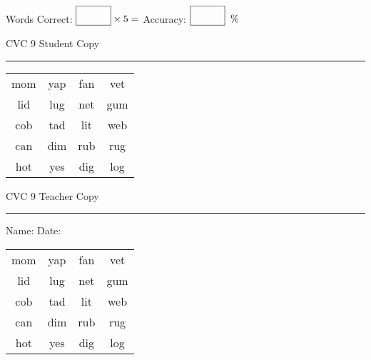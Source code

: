 \documentclass{memoir}
\begin{document}
\small

Words Correct: $\fbox{\phantom{\huge 100}} \times 5 = $ Accuracy: $\fbox{\phantom{\huge 100}}\;\; \%$ 

\vfill

\newpage


\footnotesize \noindent
CVC 9 \hfill Student Copy
\smallskip
\hrule

\Large

\setlength{\tabcolsep}{14pt}
\def\arraystretch{2}

{\selectfont


\begin{vplace}[0.5]
\begin{center}
\begin{tabular}{cccc}
mom & yap & fan & vet \\
lid & lug & net & gum  \\
cob & tad & lit & web \\
can & dim & rub & rug \\
hot & yes & dig & log \\
\end{tabular}
\end{center}
\end{vplace}

}

\newpage

\footnotesize \noindent
CVC 9 \hfill Teacher Copy
\smallskip
\hrule

\small

\vfill

\noindent
Name: \underline{\hspace{1.75in}} \hfill Date: \underline{\hspace{1in}}

\Large

{\selectfont


\begin{vplace}[0.5]
\begin{center}
\begin{tabular}{cccc}
mom & yap & fan & vet \\
lid & lug & net & gum  \\
cob & tad & lit & web \\
can & dim & rub & rug \\
hot & yes & dig & log \\
\end{tabular}
\end{center}
\end{vplace}



}
\end{document}

